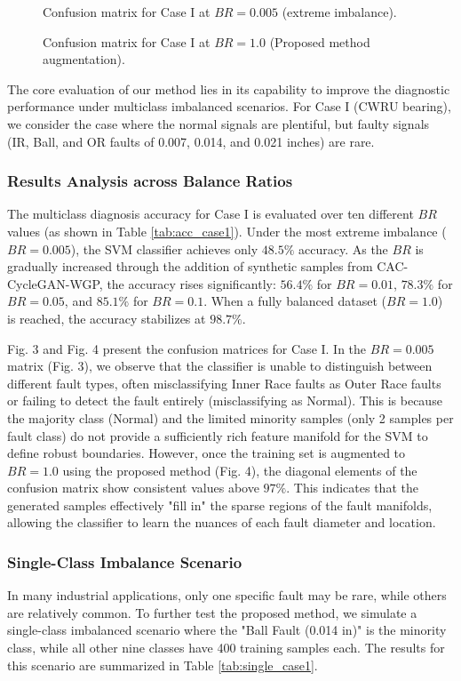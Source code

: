 \begin{figure}[htbp]
\centering
\caption{Confusion matrix for Case I at $BR=0.005$ (extreme imbalance).}
\end{figure}

\begin{figure}[htbp]
\centering
\caption{Confusion matrix for Case I at $BR=1.0$ (Proposed method augmentation).}
\end{figure}

The core evaluation of our method lies in its capability to improve the diagnostic performance under multiclass imbalanced scenarios. For Case I (CWRU bearing), we consider the case where the normal signals are plentiful, but faulty signals (IR, Ball, and OR faults of 0.007, 0.014, and 0.021 inches) are rare.

\subsubsection{Results Analysis across Balance Ratios}
The multiclass diagnosis accuracy for Case I is evaluated over ten different $BR$ values (as shown in Table \ref{tab:acc_case1}). Under the most extreme imbalance ($BR = 0.005$), the SVM classifier achieves only $48.5\%$ accuracy. As the $BR$ is gradually increased through the addition of synthetic samples from CAC-CycleGAN-WGP, the accuracy rises significantly: $56.4\%$ for $BR=0.01$, $78.3\%$ for $BR=0.05$, and $85.1\%$ for $BR=0.1$. When a fully balanced dataset ($BR=1.0$) is reached, the accuracy stabilizes at $98.7\%$.

Fig. 3 and Fig. 4 present the confusion matrices for Case I. In the $BR=0.005$ matrix (Fig. 3), we observe that the classifier is unable to distinguish between different fault types, often misclassifying Inner Race faults as Outer Race faults or failing to detect the fault entirely (misclassifying as Normal). This is because the majority class (Normal) and the limited minority samples (only 2 samples per fault class) do not provide a sufficiently rich feature manifold for the SVM to define robust boundaries. However, once the training set is augmented to $BR=1.0$ using the proposed method (Fig. 4), the diagonal elements of the confusion matrix show consistent values above $97\%$. This indicates that the generated samples effectively "fill in" the sparse regions of the fault manifolds, allowing the classifier to learn the nuances of each fault diameter and location.

\subsubsection{Single-Class Imbalance Scenario}
In many industrial applications, only one specific fault may be rare, while others are relatively common. To further test the proposed method, we simulate a single-class imbalanced scenario where the "Ball Fault (0.014 in)" is the minority class, while all other nine classes have 400 training samples each. The results for this scenario are summarized in Table \ref{tab:single_case1}.

